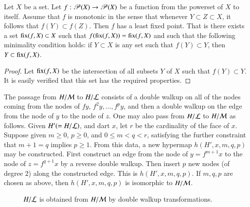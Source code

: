 \begin{lemma}   
Let $X$ be a set.  Let $f:{\mathscr P}(X)\to {\mathscr P}(X)$ be a
function from the powerset of $X$ to itself.  Assume that $f$ is
monotonic in the sense that whenever $Y\subset Z\subset X$, it
follows that $f(Y) \subset f(Z)$.  Then $f$ has a least fixed point.
That is there exists a set ${\operatorname{fix}}(f,X)\subset X$ such that
$f({\operatorname{fix}}(f,X)) = {\operatorname{fix}}(f,X)$ and such that the following
minimality condition holds: if $Y\subset X$ is any set such that
$f(Y) \subset Y$, then $Y\subset {\operatorname{fix}}(f,X)$.
\end{lemma}
%
%
%
%
%

\begin{proof} Let ${\operatorname{fix}}(f,X)$ be the intersection of all subsets
$Y$ of $X$ such that $f(Y)\subset Y$.  It is easily verified that
this set has the required properties.
\end{proof}


\begin{remark}
The passage from $H/{\cal M}$ to $H/{\cal L}$ consists of a double
walkup on all of the nodes coming from the nodes of $f y$, $f^2 y,
\ldots, f^p y$, and then a double walkup on the edge from the node of
$y$ to the node of
$z$.  %
One may also pass from $H/{\cal L}$ to $H/{\cal M}$ as follows.  Given
$H' (= H/{\cal L})$, and dart $x$, let $r$ be the cardinality of the
face of $x$.  Suppose given $m\ge 0$, $p\ge 0$, and $0 \le m < q < r$,
satisfying the further constraint that $m+1=q$ implies $p\ge1$.  From
this data, a new hypermap $h(H',x,m,q,p)$ may be constructed.  First
construct an edge from the node of $y = f^{m+1} x$ to the node of $z =
f^{q+1} x$ by a reverse double walkup.  Then insert $p$ new nodes (of
degree $2$) along the constructed edge.  This is $h(H',x,m,q,p)$.  If
$m,q,p$ are chosen as above, then $h(H',x,m,q,p)$ is isomorphic to
$H/{\cal M}$.  %
\end{remark}

\begin{figure}[htb]
\centering
{}
\caption{$H/{\cal L}$ is obtained from $H/{\cal M}$ by double walkup
transformations.}
\label{fig:L1L2dart}
\end{figure}

